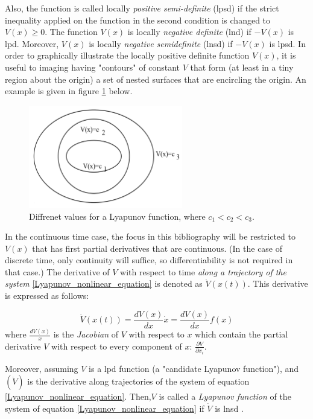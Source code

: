 \documentclass{thesisreport}
\begin{document}
Also, the function is called locally \textit{positive semi-definite} (lpsd) if the strict inequality applied on the function in the second condition is changed to $V(x) \geq 0$. The function $V(x)$ is locally \textit{negative definite} (lnd) if $-V(x)$ is lpd. Moreover, $V(x)$ is locally \textit{negative semidefinite} (lnsd) if $-V(x)$ is lpsd. In order to graphically illustrate the locally positive definite function $V(x)$, it is useful to imaging having "contours" of constant $V$ that form (at least in a tiny region about the origin) a set of nested surfaces that are encircling the origin. An example is given in figure \ref{Lyapunov_figure} below. 


\begin{figure}[h]
\centering
\includegraphics[width=0.6\textwidth]{Images/Control/Lyapunov_function}
\caption{Diffrenet values for a Lyapunov function, where $c_1<c_2<c_3$. \cite{Dahleh2011}}
\label{Lyapunov_figure}
\end{figure}

In the continuous time case, the focus in this bibliography will be restricted to $V(x)$ that has first partial derivatives that are continuous. (In the case of discrete time, only continuity will suffice, so differentiability is not required in that case.) The derivative of $V$ with respect to time \textit{along a trajectory of the system} \ref{Lyapunov_nonlinear_equation} is denoted as $\dot{V}(x(t))$. This derivative is expressed as follows:

\begin{equation}
\dot{V}(x(t)) = \frac{dV(x)}{dx}\dot{x} = \frac{dV(x)}{dx}f(x)
\end{equation}
where 
$\frac{dV(x)}{x}$ is the \textit{Jacobian} of $V$ with respect to $x$ which contain the partial derivative $V$ with respect to every component of $x$: $\frac{\partial V}{\partial x_i}$.

Moreover, assuming $V$ is a lpd function (a "candidate Lyapunov function"), and $(\dot{V})$ is the derivative along trajectories of the system of equation \ref{Lyapunov_nonlinear_equation}. Then,$V$ is called a \textit{Lyapunov function} of the system of equation \ref{Lyapunov_nonlinear_equation} if $\dot{V}$ is lnsd \cite{Dahleh2011}.
\end{document}
